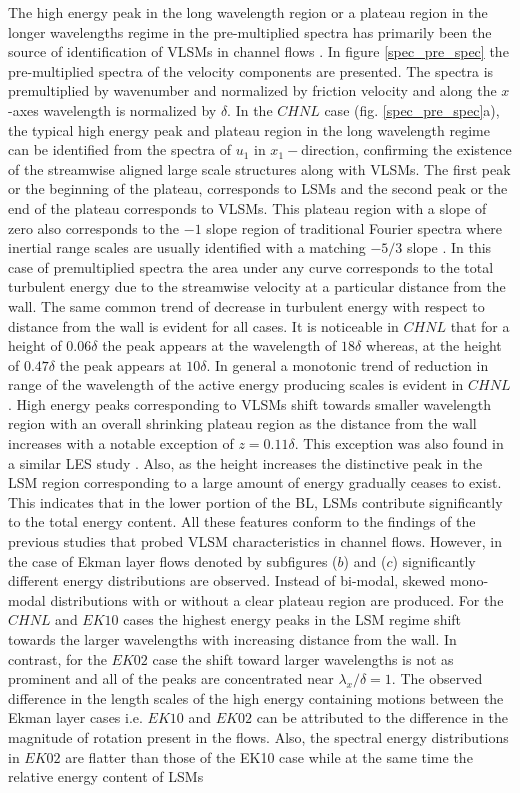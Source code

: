 \documentclass{amsart}
\begin{document}
The high energy peak in the  long wavelength region or a plateau region in the longer wavelengths regime in the pre-multiplied spectra has primarily been the source of identification of VLSMs in channel flows \citep{guala_adrian_jfm2006, fang2015blm}. In figure \ref{spec_pre_spec} the pre-multiplied spectra of the velocity components are presented. The spectra is  premultiplied by wavenumber and normalized by friction velocity and along the $x$-axes wavelength is normalized by $\delta$.  In the $CHNL$ case (fig. \ref{spec_pre_spec}a), the typical high energy peak and plateau region in the long wavelength regime can be identified from the spectra of $u_1$ in $x_1-$direction, confirming the existence of the streamwise aligned large scale structures along with VLSMs. The first peak or the beginning of the plateau, corresponds to LSMs and the second peak or the end of the plateau corresponds to VLSMs. This plateau region with a slope of zero also corresponds to the $-1$ slope region of traditional Fourier spectra where inertial range scales are usually identified with a matching $-5/3$ slope \citep{perry_chng_jfm_86,saddoughi1994}. In this case of premultiplied spectra the area under any curve corresponds to the total turbulent energy due to the streamwise velocity at a particular distance from the wall. The same common trend of decrease in turbulent energy with respect to distance from the wall is evident for all cases. It is noticeable in $CHNL$  that for a height of $0.06\delta$ the peak appears at the wavelength of $18\delta$ whereas, at the height of $0.47\delta$ the peak appears at $10\delta$. In general a monotonic trend of reduction in range of the wavelength of the active energy producing scales is evident in $CHNL$. High energy peaks corresponding to VLSMs shift towards smaller wavelength region with an overall shrinking plateau region as the distance from the wall increases with a notable exception of $z=0.11\delta$. This exception was also found in a similar LES study \citep{fang2015blm}.  Also, as the height increases the distinctive peak in the LSM region corresponding to a large amount of energy gradually ceases to exist. This indicates that in the lower portion of the BL, LSMs contribute significantly to the total energy content.   All these features conform to the findings of the previous studies that probed  VLSM characteristics in channel flows. However, in the case of Ekman layer flows denoted by subfigures ($b$) and ($c$)  significantly  different energy distributions are observed. Instead of bi-modal, skewed mono-modal distributions with or without a clear plateau region are produced. For the $CHNL$ and $EK10$ cases the highest energy peaks in the LSM regime shift towards the larger wavelengths with increasing distance from the wall. In contrast, for the $EK02$ case the shift toward  larger wavelengths is not as prominent and all of the peaks are concentrated near $\lambda_x/\delta=1$. The observed difference in the length scales of the high energy containing motions between the Ekman layer cases i.e. $EK10$ and $EK02$ can be attributed to the difference in the magnitude of rotation present in the flows. Also, the spectral energy distributions in $EK02$  are flatter than those of the EK10 case while at the same time the relative energy content of LSMs 
\end{document}
